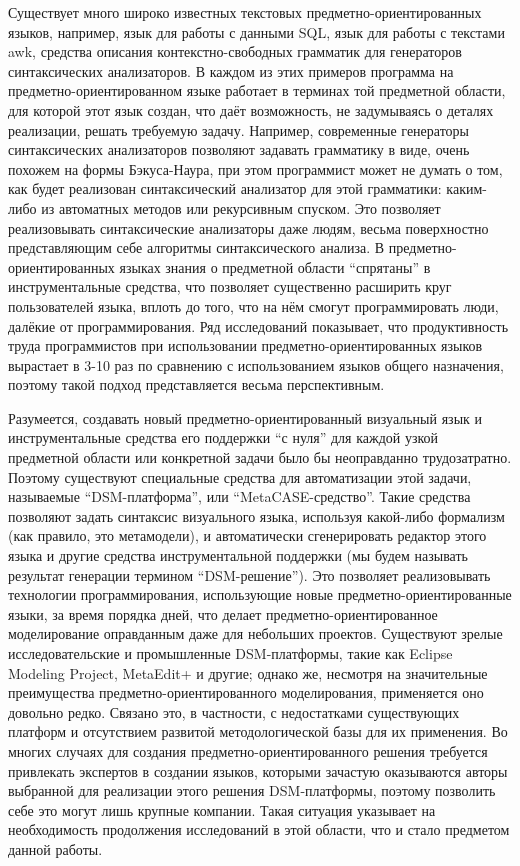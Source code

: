 Существует много широко известных текстовых предметно-ориентированных языков, 
например, язык для работы с данными SQL, язык для работы с текстами awk,
средства описания контекстно-свободных грамматик для генераторов синтаксических 
анализаторов. В каждом из этих примеров программа на предметно-ориентированном 
языке работает в терминах той предметной области, для которой этот язык создан,
что даёт возможность, не задумываясь о деталях реализации, решать требуемую 
задачу. Например, современные генераторы синтаксических анализаторов позволяют 
задавать грамматику в виде, очень похожем на формы Бэкуса-Наура, при этом 
программист может не думать о том, как будет реализован синтаксический 
анализатор для этой грамматики: каким-либо из автоматных методов или рекурсивным 
спуском. Это позволяет реализовывать синтаксические анализаторы 
даже людям, весьма поверхностно представляющим себе алгоритмы синтаксического 
анализа. В предметно-ориентированных языках знания о предметной области "`спрятаны"' 
в инструментальные средства, что позволяет существенно расширить круг пользователей языка, 
вплоть до того, что на нём смогут программировать люди, далёкие от программирования. Ряд исследований
показывает, что продуктивность труда программистов при использовании 
предметно-ориентированных языков вырастает в 3-10 раз по сравнению с 
использованием языков общего назначения, поэтому такой подход представляется 
весьма перспективным.

Разумеется, создавать новый предметно-ориентированный визуальный язык и 
инструментальные средства его поддержки "`с нуля"' для каждой узкой предметной 
области или конкретной задачи было бы неоправданно трудозатратно. Поэтому 
существуют специальные средства для автоматизации этой задачи, называемые 
"`DSM-платформа"', или "`MetaCASE-средство"'. Такие средства позволяют задать 
синтаксис визуального языка, используя какой-либо формализм (как правило, 
это метамодели), и автоматически сгенерировать редактор этого языка и другие средства инструментальной 
поддержки (мы будем называть результат генерации термином "`DSM-решение"'). 
Это позволяет реализовывать технологии программирования, использующие новые предметно-ориентированные языки, за время 
порядка дней, что делает предметно-ориентированное моделирование оправданным 
даже для небольших проектов. Существуют зрелые исследовательские и промышленные 
DSM-платформы, такие как Eclipse Modeling Project, MetaEdit+ и другие; однако же, 
несмотря на значительные преимущества предметно-ориентированного 
моделирования, применяется оно довольно редко. Связано это, в частности, с 
недостатками существующих платформ и отсутствием развитой методологической 
базы для их применения. Во многих случаях для создания предметно-ориентированного 
решения требуется привлекать экспертов в создании языков, которыми зачастую 
оказываются авторы выбранной для реализации этого решения DSM-платформы, поэтому 
позволить себе это могут лишь крупные компании. Такая ситуация указывает на 
необходимость продолжения исследований в этой области, что и стало предметом 
данной работы.

